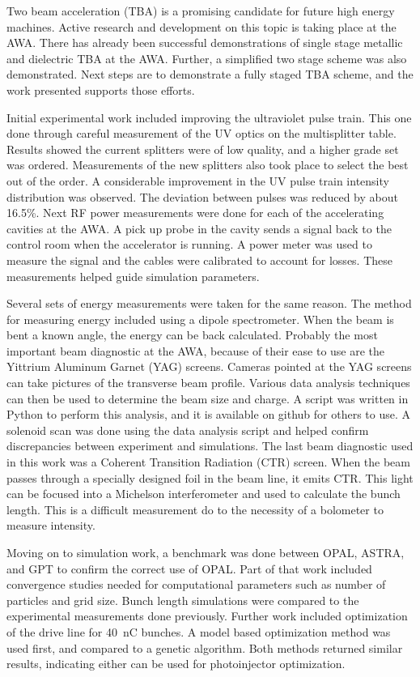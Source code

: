 
Two beam acceleration (TBA) is a promising candidate for future high energy machines. Active research and development on this topic is taking place at the AWA. There has already been successful demonstrations of single stage metallic and dielectric 
TBA at the AWA. Further, a simplified two stage scheme was also demonstrated. 
Next steps are to demonstrate a fully staged TBA scheme, 
and the work presented supports those efforts. 

Initial experimental work included improving the ultraviolet pulse train. This one done through careful measurement of the UV optics on the multisplitter table. Results showed the current splitters were of low quality, and a higher grade set was ordered. Measurements of the new splitters also took place 
to select the best out of the order. 
A considerable improvement in the UV pulse train intensity distribution was observed. The deviation between pulses was reduced by about 16.5\%.
Next RF power measurements were done for each of the accelerating 
cavities at the AWA. A pick up probe in the cavity sends a signal back to the control room when the accelerator is running. A power meter was used to measure the signal and the cables were calibrated to account for losses. 
These measurements helped guide simulation parameters. 

Several sets of energy measurements were taken for the same reason. 
The method for measuring energy included using a dipole spectrometer. 
When the beam is bent a known angle, the energy can be back calculated. 
Probably the most important beam diagnostic at the AWA, 
because of their ease to use are the Yittrium Aluminum Garnet (YAG) screens. 
Cameras pointed at the YAG screens can take pictures of the 
transverse beam profile. 
Various data analysis techniques can then be used to determine 
the beam size and charge. A script was written in Python
to perform this analysis, and it is available on github for others to use. 
A solenoid scan was done using the data analysis script
and helped confirm discrepancies between experiment and 
simulations. 
The last beam diagnostic used in this work was a Coherent Transition Radiation (CTR) screen. When the beam passes
through a specially designed foil in the beam line, 
it emits CTR. This light can be focused into a Michelson 
interferometer and used to calculate the bunch length. 
This is a difficult measurement do to the necessity of a 
bolometer to measure intensity. 

Moving on to simulation work, a benchmark was done between OPAL, ASTRA, and GPT 
to confirm the correct use of OPAL. 
Part of that work included convergence studies needed for computational parameters such as number of particles and grid size.
Bunch length simulations were compared to the experimental 
measurements done previously.
Further work included optimization of the drive line for \SI{40}{nC} bunches. 
A model based optimization method was used first, 
and compared to a genetic algorithm. 
Both methods returned similar results, indicating either
can be used for photoinjector optimization. 

